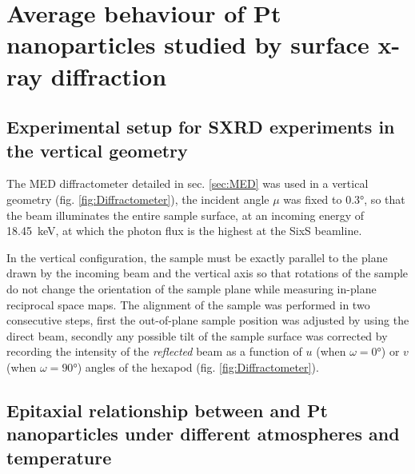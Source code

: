\section{Average behaviour of Pt nanoparticles studied by surface x-ray diffraction}


\subsection{Experimental setup for SXRD experiments in the vertical geometry}\label{sec:SXRDSetupV}

The MED diffractometer detailed in sec. \ref{sec:MED} was used in a vertical geometry (fig. \ref{fig:Diffractometer}), the incident angle $\mu$ was fixed to \ang{0.3}, so that the beam illuminates the entire sample surface, at an incoming energy of \qty{18.45}{\keV}, at which the photon flux is the highest at the SixS beamline.

In the vertical configuration, the sample must be exactly parallel to the plane drawn by the incoming beam and the vertical axis so that rotations of the sample do not change the orientation of the sample plane while measuring in-plane reciprocal space maps.
The alignment of the sample was performed in two consecutive steps, first the out-of-plane sample position was adjusted by using the direct beam, secondly any possible tilt of the sample surface was corrected by recording the intensity of the \textit{reflected} beam as a function of $u$ (when $\omega=\ang{0}$) or $v$ (when $\omega=\ang{90}$) angles of the hexapod (fig. \ref{fig:Diffractometer}).

\subsection{Epitaxial relationship between  and Pt nanoparticles under different atmospheres and temperature}

